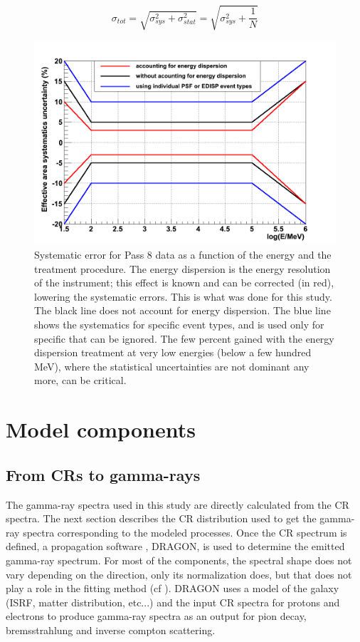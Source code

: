 \begin{equation}
\sigma_{tot} =\sqrt{\sigma_{sys}^2 + \sigma_{stat}^2} = \sqrt{\sigma_{sys}^2 + \frac{1}{N}}
\end{equation}


\begin{figure}[h]
 \centering
 \includegraphics[width=.6\linewidth]{pic/method/LAT_sys_error.png}
 \caption{Systematic error for Pass 8 data as a function of the energy and the treatment procedure. The energy dispersion is the energy resolution of the instrument; this effect is known and can be corrected (in red), lowering the systematic errors. This is what was done for this study. The black line does not account for energy dispersion. The blue line shows the systematics for specific event types, and is used only for specific that can be ignored. The few percent gained with the energy dispersion treatment at very low energies (below a few hundred MeV), where the statistical uncertainties are not dominant any more, can be critical.}
 \label{fig:LAT_sys_err}
\end{figure}




\newpage
\section{Model components}
\subsection{From CRs to gamma-rays}

The gamma-ray spectra used in this study are directly calculated from the CR spectra. The next section describes the CR distribution used to get the gamma-ray spectra corresponding to the modeled processes. Once the CR spectrum is defined, a propagation software , DRAGON, is used to determine the emitted gamma-ray spectrum. For most of the components, the spectral shape does not vary depending on the direction, only its normalization does, but that does not play a role in the fitting method (cf ).
DRAGON uses a model of the galaxy (ISRF, matter distribution, etc...) and the input CR spectra for protons and electrons to produce gamma-ray spectra as an output for pion decay, bremsstrahlung and inverse compton scattering.


